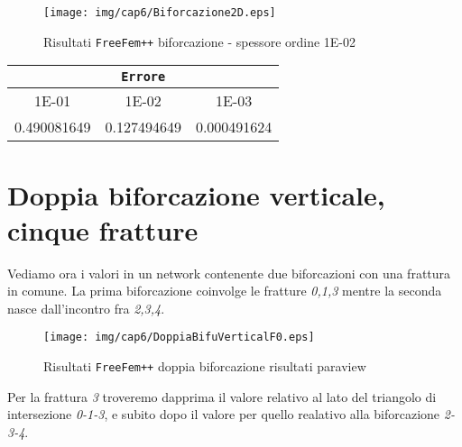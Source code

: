 \begin{figure}[h!]
\centering
\texttt{[image: img/cap6/Biforcazione2D.eps]}
\caption{Risultati \texttt{FreeFem++} biforcazione - spessore ordine 1E-02 }\label{Biforcazione1E-02}
\end{figure}

\begin{center}
\begin{tabular}{|c|c|c|}
\hline
  \multicolumn{3}{|c|}{\textbf{\texttt{Errore}}} \\ 
\hline
\multicolumn{1}{|c|}{1E-01} & 1E-02 & 1E-03 \\
\hline
 0.490081649 & 0.127494649 & 0.000491624 \\
\hline
\end{tabular}
\end{center}

\section{Doppia biforcazione verticale, cinque fratture}
Vediamo ora i valori in un network contenente due biforcazioni con una frattura in comune.
La prima biforcazione coinvolge le fratture \textit{0,1,3} mentre la seconda nasce dall'incontro fra \textit{2,3,4}.

\begin{figure}[h!]
\centering
\texttt{[image: img/cap6/DoppiaBifuVerticalF0.eps]}
\caption{Risultati \texttt{FreeFem++} doppia biforcazione risultati paraview }\label{DoppiaBifuVerticalParaview}
\end{figure}

\noindent Per la frattura \textit{3} troveremo dapprima il valore relativo al lato del triangolo di intersezione \textit{0-1-3}, e subito dopo il valore per quello realativo alla biforcazione \textit{2-3-4}.

